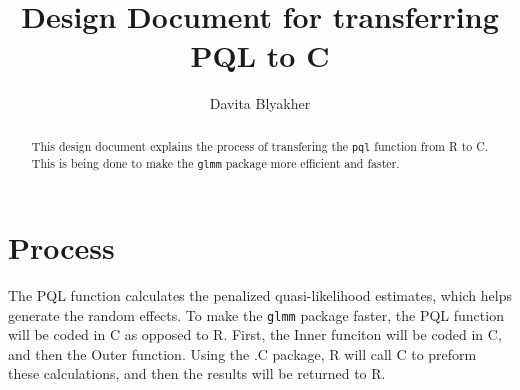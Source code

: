 \documentclass{article}
\title{Design Document for transferring PQL to C}
\author{Davita Blyakher}
\begin{document}
\maketitle{}

\begin{abstract}
This design document explains the process of transfering the \texttt{pql} function from R to C. This is being done to make the \texttt{glmm} package more efficient and faster.
\end{abstract}

\section{Process}

The PQL function calculates the penalized quasi-likelihood estimates, which helps generate the random effects. To make the \texttt{glmm} package faster, the PQL function will be coded in C as opposed to R. First, the Inner funciton will be coded in C, and then the Outer function. Using the .C package, R will call C to preform these calculations, and then the results will be returned to R. 
\end{document}
